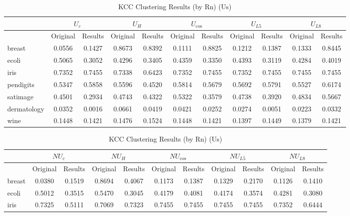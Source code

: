 \documentclass[twocolumn]{article}
\begin{document}
\begin{table}[h]
  \centering
  \begin{tabular}{l|cc|cc|cc|cc|cc}
    \hline
    & \multicolumn{2}{c|}{$U_c$} & \multicolumn{2}{c|}{$U_H$} & \multicolumn{2}{c|}{$U_{\cos}$} & \multicolumn{2}{c|}{$U_{L5}$} & \multicolumn{2}{c}{$U_{L8}$} \\
    \hline
    & Original & Results & Original & Results & Original & Results & Original & Results & Original & Results \\
    \hline
    breast & 0.0556 & 0.1427 & 0.8673 & 0.8392 & 0.1111 & 0.8825 & 0.1212 & 0.1387 & 0.1333 & 0.8445 \\
    ecoli & 0.5065 & 0.3052 & 0.4296 & 0.3405 & 0.4359 & 0.3350 & 0.4393 & 0.3119 & 0.4284 & 0.4019 \\
    iris & 0.7352 & 0.7455 & 0.7338 & 0.6423 & 0.7352 & 0.7455 & 0.7352 & 0.7455 & 0.7455 & 0.7455 \\
    pendigits & 0.5347 & 0.5858 & 0.5596 & 0.4520 & 0.5814 & 0.5679 & 0.5692 & 0.5791 & 0.5527 & 0.6174 \\
    satimage & 0.4501 & 0.2934 & 0.4743 & 0.4322 & 0.5322 & 0.3579 & 0.4738 & 0.3920 & 0.4834 & 0.5667 \\
    dermatology & 0.0352 & 0.0016 & 0.0661 & 0.0419 & 0.0421 & 0.0252 & 0.0274 & 0.0051 & 0.0223 & 0.0332 \\
    wine & 0.1448 & 0.1421 & 0.1476 & 0.1524 & 0.1448 & 0.1421 & 0.1397 & 0.1449 & 0.1379 & 0.1421 \\
    \hline
  \end{tabular}
  \caption{KCC Clustering Results (by Rn) (Us)}
  \label{table:combined-results-us}
  \centering
  \begin{tabular}{l|cc|cc|cc|cc|cc}
    \hline
    & \multicolumn{2}{c|}{$NU_c$} & \multicolumn{2}{c|}{$NU_H$} & \multicolumn{2}{c|}{$NU_{\cos}$} & \multicolumn{2}{c|}{$NU_{L5}$} & \multicolumn{2}{c}{$NU_{L8}$} \\
    \hline
    & Original & Results & Original & Results & Original & Results & Original & Results & Original & Results \\
    \hline
    breast & 0.0380 & 0.1519 & 0.8694 & 0.4067 & 0.1173 & 0.1387 & 0.1329 & 0.2170 & 0.1126 & 0.1410 \\
    ecoli & 0.5012 & 0.3515 & 0.5470 & 0.3045 & 0.4179 & 0.4081 & 0.4174 & 0.3574 & 0.4281 & 0.3080 \\
    iris & 0.7325 & 0.5111 & 0.7069 & 0.7323 & 0.7455 & 0.7455 & 0.7455 & 0.7455 & 0.7352 & 0.6444 \\

\end{tabular}
\end{table}
\end{document}
